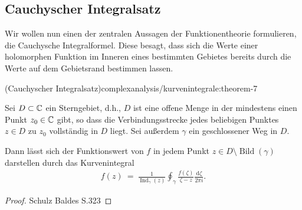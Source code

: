 \subsection{Cauchyscher Integralsatz}
\label{\detokenize{complexanalysis/kurvenintegrale:cauchyscher-integralsatz}}
\par
Wir wollen nun einen der zentralen Aussagen der Funktionentheorie formulieren, die Cauchysche Integralformel.
Diese besagt, dass sich die Werte einer holomorphen Funktion im Inneren eines bestimmten Gebietes bereits durch die Werte auf dem Gebietsrand bestimmen lassen.
\begin{theorem}{(Cauchyscher Integralsatz)}{complexanalysis/kurvenintegrale:theorem-7}



\par
Sei \(D \subset \mathbb{C}\) ein Sterngebiet, d.h., \(D\) ist eine offene Menge in der mindestens einen Punkt \(z_0 \in \mathbb{C}\) gibt, so dass die Verbindungsstrecke jedes beliebigen Punktes \(z \in D\) zu \(z_0\) vollständig in \(D\) liegt.
Sei außerdem \(\gamma\) ein geschlossener Weg in \(D\).

\par
Dann lässt sich der Funktionswert von \(f\) in jedem Punkt \(z \in D \setminus \operatorname{Bild}(\gamma)\) darstellen durch das Kurvenintegral
\begin{align*}
f(z) \ = \ \frac{1}{\operatorname{Ind}_\gamma(z)} \oint_\gamma \frac{f(\zeta)}{\zeta - z} \frac{\mathrm{d}\zeta}{2\pi i}.
\end{align*}\end{theorem}

\begin{proof}
 Schulz Baldes S.323
\end{proof}

